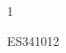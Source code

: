 \documentclass[a4paper,11pt]{report}
\begin{document}
\begin{exop}
{\begin{center}
 \end{center}

} 
{1}
\end{exop}

\begin{exol}{ES34}{101}{2}
\end{exol}
\end{document}
